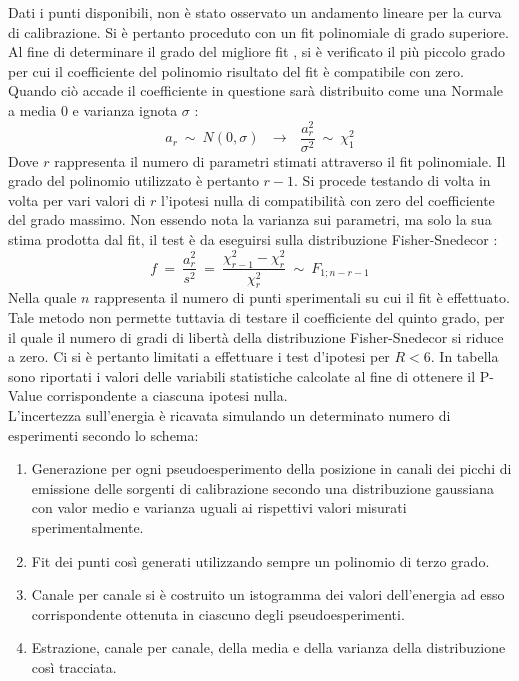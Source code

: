 \documentclass[11pt]{article}
\begin{document}
Dati i punti disponibili, non è stato osservato un andamento lineare per la curva di calibrazione. Si è pertanto proceduto con un fit polinomiale di grado superiore.\\
Al fine di determinare il grado del migliore fit , si è verificato il più piccolo grado per cui il coefficiente del polinomio risultato del fit è compatibile con zero. Quando ciò accade il coefficiente in questione sarà distribuito come una \cite{delprete_normalreg} Normale a media 0 e varianza ignota $\sigma$ :
\begin{equation}
a_{r}\ \sim \  N(0,\sigma) \ \ \ \rightarrow \ \ \  \dfrac{a^2_{r}}{\sigma^2}\ \sim\ \chi^2_{1} 
\nonumber
\end{equation}
Dove $r$ rappresenta il numero di parametri stimati attraverso il fit polinomiale. Il grado del polinomio utilizzato è pertanto $r-1$. Si procede testando di volta in volta per vari valori di $r$ l'ipotesi nulla di compatibilità con zero del coefficiente del grado massimo. Non essendo nota la varianza sui parametri, ma solo la sua stima prodotta dal fit, il test è da eseguirsi sulla distribuzione Fisher-Snedecor \cite{delprete_normalreg}:
\begin{equation}
f\ = \ \frac{a_r^2}{s^2}\ = \ \frac{\chi^2_{r-1}-\chi^2_r}{\chi^2_r}\ \sim \ F_{1;n-r-1}
\nonumber
\end{equation}
Nella quale $n$ rappresenta il numero di punti sperimentali su cui il fit è effettuato. Tale metodo non permette tuttavia di testare il coefficiente del quinto grado, per il quale il numero di gradi di libertà della distribuzione Fisher-Snedecor si riduce a zero. Ci si è pertanto limitati a effettuare i test d'ipotesi per $R<6$. In tabella sono riportati i valori delle variabili statistiche calcolate al fine di ottenere il P-Value corrispondente a ciascuna ipotesi nulla.\\

L'incertezza sull'energia è ricavata simulando un determinato numero di esperimenti secondo lo schema:
\begin{enumerate}
\item Generazione per ogni pseudoesperimento della posizione in canali dei picchi di emissione delle sorgenti di calibrazione secondo una distribuzione gaussiana con valor medio e varianza uguali ai rispettivi valori misurati sperimentalmente.
\item Fit dei punti così generati utilizzando sempre un polinomio di terzo grado.
\item Canale per canale si è costruito un istogramma dei valori dell'energia ad esso corrispondente ottenuta in ciascuno degli pseudoesperimenti.
\item Estrazione, canale per canale, della media e della varianza della distribuzione così tracciata.
\end{enumerate}
\end{document}

